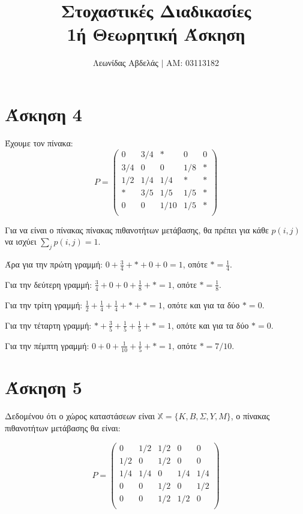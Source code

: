 \documentclass{article}
\title{Στοχαστικές Διαδικασίες \\
    1ή Θεωρητική Άσκηση}
\begin{document}
\date{}
\author{Λεωνίδας Αβδελάς $|$ ΑΜ: 03113182}

\maketitle

\section*{Άσκηση 4}

Έχουμε τον πίνακα:
\begin{equation*}
    P = 
    \begin{pmatrix}
    0 & 3/4 & * & 0 & 0\\
    3/4 & 0 & 0 & 1/8 & *\\
    1/2 & 1/4 & 1/4 & * & *\\
    * & 3/5 & 1/5 & 1/5 & *\\
    0 & 0 & 1/10 & 1/5 & *\\
    \end{pmatrix}
\end{equation*}

Για να είναι ο πίνακας πίνακας πιθανοτήτων μετάβασης, θα πρέπει για κάθε $p(i,j)$ να ισχύει $\sum_{j}{p(i,j)} = 1$.

Άρα για την πρώτη γραμμή: $0 + \frac{3}{4} + * + 0 + 0 = 1$, οπότε $* = \frac{1}{4}$.

Για την δεύτερη γραμμή: $\frac{3}{4} + 0 + 0 + \frac{1}{8} + * = 1$, οπότε $* = \frac{1}{8}$.

Για την τρίτη γραμμή: $\frac{1}{2} + \frac{1}{4} + \frac{1}{4} + * + * = 1$, οπότε και για τα δύο $* = 0$.

Για την τέταρτη γραμμή: $* + \frac{3}{5} + \frac{1}{5} + \frac{1}{5} + * = 1$, οπότε και για τα δύο $* = 0$.

Για την πέμπτη γραμμή: $0 + 0 + \frac{1}{10} + \frac{1}{5} + * = 1$, οπότε $* = 7/10$.

\section*{Άσκηση 5}

Δεδομένου ότι ο χώρος καταστάσεων είναι $\mathbb{X} = \{K, B, Σ, Y, M\}$, ο πίνακας πιθανοτήτων μετάβασης θα είναι:

\begin{equation*}
    P = 
    \begin{pmatrix}
        0 & 1/2 & 1/2 & 0 & 0\\
        1/2 & 0 & 1/2 & 0 & 0\\
        1/4 & 1/4 & 0 & 1/4 & 1/4\\
        0 & 0 & 1/2 & 0 & 1/2\\
        0 & 0 & 1/2 & 1/2 & 0\\
    \end{pmatrix}
\end{equation*}
\end{document}
